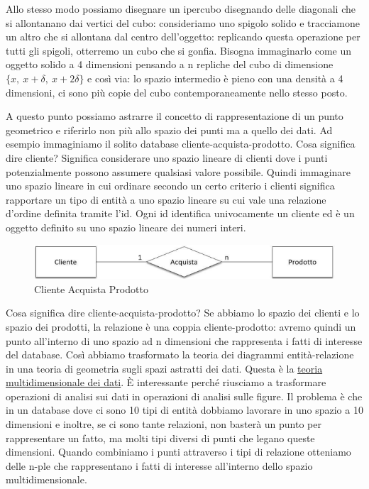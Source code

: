 Allo stesso modo possiamo disegnare un ipercubo disegnando delle diagonali che si allontanano dai vertici del cubo: consideriamo uno spigolo solido e tracciamone un 
altro che si allontana dal centro dell’oggetto: replicando questa operazione per tutti gli spigoli, otterremo un cubo che si gonfia. Bisogna immaginarlo come un oggetto solido 
a 4 dimensioni pensando a n repliche del cubo di dimensione $\{x,\ x+\delta,\ x+2\delta\}$ e così via: lo spazio intermedio è pieno con una densità a 4 dimensioni, ci sono 
più copie del cubo contemporaneamente nello stesso posto.

A questo punto possiamo astrarre il concetto di rappresentazione di un punto geometrico e riferirlo non più allo spazio dei punti ma a quello dei dati. Ad esempio immaginiamo il solito database cliente-acquista-prodotto. Cosa significa dire cliente? Significa considerare uno spazio lineare di clienti dove i punti potenzialmente possono assumere qualsiasi valore possibile. Quindi immaginare uno spazio lineare in cui ordinare secondo un certo criterio i clienti significa rapportare un tipo di entità a uno 
spazio lineare su cui vale una relazione d’ordine definita tramite l’id. Ogni id identifica univocamente un cliente ed è un oggetto definito su uno spazio lineare dei numeri interi.

\begin{center}
\begin{figure}[H]
\centering
\includegraphics[scale=0.8]{figures/cap3.png}
\caption{Cliente Acquista Prodotto}
\end{figure}
\end{center}

Cosa significa dire cliente-acquista-prodotto? Se abbiamo lo spazio dei clienti e lo spazio dei prodotti, la relazione è una coppia cliente-prodotto: avremo quindi un punto all’interno di uno spazio ad n dimensioni che rappresenta i fatti di interesse del database. Così abbiamo trasformato la teoria dei diagrammi entità-relazione in una teoria di geometria sugli spazi astratti dei dati. Questa è la \underline{teoria multidimensionale dei dati}. È interessante perché riusciamo a trasformare operazioni di analisi sui dati in operazioni di analisi sulle figure. Il problema è che in un database dove ci sono 10 tipi di entità dobbiamo lavorare in uno spazio a 10 dimensioni e inoltre, se ci sono tante relazioni, 
non basterà un punto per rappresentare un fatto, ma molti tipi diversi di punti che legano queste dimensioni. Quando combiniamo i punti attraverso i tipi di relazione otteniamo delle n-ple che rappresentano i fatti di interesse all’interno dello spazio multidimensionale.  


